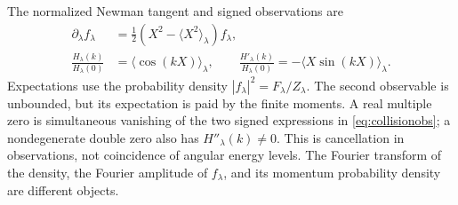 The normalized Newman tangent and signed observations are
\begin{align}
 \partial_\lambda f_\lambda
  &=\tfrac12(X^2-\langle X^2\rangle_\lambda)f_\lambda,\label{eq:tangent}\\
 \frac{H_\lambda(k)}{H_\lambda(0)}
  &=\langle\cos(kX)\rangle_\lambda,\qquad
 \frac{H'_\lambda(k)}{H_\lambda(0)}
  =-\langle X\sin(kX)\rangle_\lambda.\label{eq:collisionobs}
\end{align}
Expectations use the probability density $|f_\lambda|^2=F_\lambda/Z_\lambda$.
The second observable is unbounded, but its expectation is paid by the
finite moments. A real multiple zero is simultaneous vanishing of the
two signed expressions in \eqref{eq:collisionobs}; a nondegenerate double
zero also has $H''_\lambda(k)\ne0$.
This is cancellation in observations, not coincidence of angular energy
levels. The Fourier transform of the density, the Fourier amplitude of
$f_\lambda$, and its momentum probability density are different objects.
